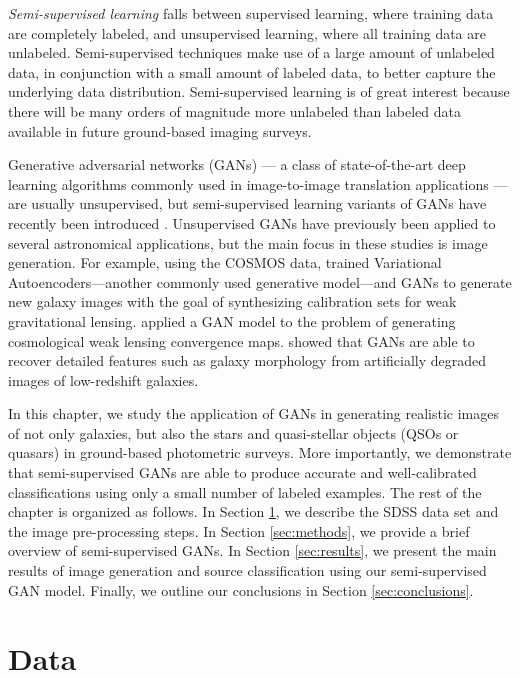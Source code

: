 \emph{Semi-supervised learning} falls between supervised learning, where training data are completely labeled,
and unsupervised learning, where all training data are unlabeled.
Semi-supervised techniques make use of a large amount of unlabeled data, in conjunction with a small amount of labeled data,
to better capture the underlying data distribution.
Semi-supervised learning is of great interest because there will be many orders of magnitude
more unlabeled than labeled data available in future ground-based imaging surveys.

Generative adversarial networks (GANs) --- a class of state-of-the-art deep learning algorithms commonly used in
image-to-image translation applications --- are usually unsupervised,
but semi-supervised learning variants of GANs have recently been introduced
\citep{springenberg2016unsupervised,salimans2016improved,odena2016semi}.
Unsupervised GANs have previously been applied to several astronomical applications,
but the main focus in these studies is image generation.
For example, using the COSMOS data, \citet{ravanbakhsh2017enabling} trained
Variational Autoencoders---another commonly used generative model---and GANs
to generate new galaxy images with the goal of synthesizing calibration sets for weak gravitational lensing.
\citet{mustafa2017creating} applied a GAN model to the problem of generating cosmological weak lensing convergence maps.
\citet{schawinski2017generative} showed that GANs are able to recover detailed features such as galaxy morphology
from artificially degraded images of low-redshift galaxies.

In this chapter, we study the application of GANs in generating realistic images of not only galaxies,
but also the stars and quasi-stellar objects (QSOs or quasars) in ground-based photometric surveys.
More importantly, we demonstrate that semi-supervised GANs are able to produce accurate and well-calibrated classifications
using only a small number of labeled examples.
The rest of the chapter is organized as follows.
In Section \ref{sec:data}, we describe the SDSS data set and the image pre-processing steps.
In Section \ref{sec:methods}, we provide a brief overview of semi-supervised GANs.
In Section \ref{sec:results}, we present the main results of image generation and source classification using our semi-supervised GAN model.
Finally, we outline our conclusions in Section \ref{sec:conclusions}.

\section{Data}
  \label{sec:data}
  
